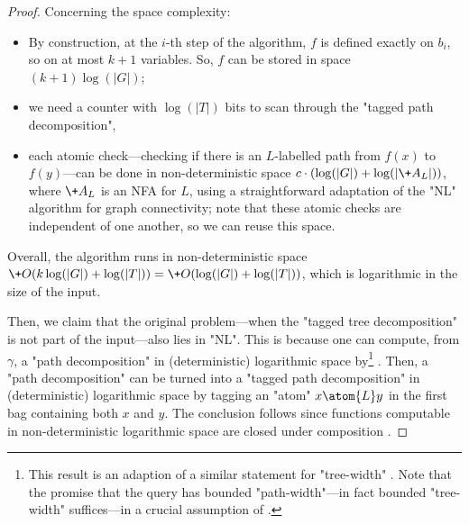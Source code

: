 \begin{proof}
	Concerning the space complexity:
	\begin{itemize}
		\item By construction, at the $i$-th step of the algorithm, $f$ is defined exactly on $b_i$, so on at most $k+1$ variables.
		So, $f$ can be stored in space $(k+1)\log(|G|)$;
		\item we need a counter with $\log(|T|)$ bits to scan through the "tagged path decomposition",
		\item each atomic check---checking if there is an $L$-labelled path from $f(x)$ to $f(y)$---can be done in non-deterministic space $c\cdot (\log(|G|) + \log(|\+A_L|))$,
		where $\+A_L$ is an NFA for $L$, using a straightforward adaptation of the "NL" algorithm for graph connectivity; note that these atomic checks are
		independent of one another, so we can reuse this space.
	\end{itemize}
	Overall, the algorithm runs in non-deterministic space
	$\+O(k\log(|G|) + \log(|T|)) = \+O(\log(|G|) + \log(|T|))$,
	which is logarithmic in the size of the input.

	\smallskip

	Then, we claim that the original problem---when the "tagged tree decomposition" is not part of 
	the input---also lies in "NL". This is because one can compute, from $\gamma$, a
	"path decomposition" in (deterministic) logarithmic space by\footnote{This result is an 
	adaption of a similar statement for "tree-width" \cite[Theorem I.1, p. 143]{ElberfeldJakobyTantau2010Logspace}. Note that the promise that the query has bounded "path-width"---in fact bounded "tree-width" suffices---in a crucial assumption of  \cite[Theorem I.1, p. 143]{ElberfeldJakobyTantau2010Logspace}.} 
	\cite[Theorem 1.3, p. 2]{KintaliMunteanu2010Computing}. Then, a "path decomposition" can be turned into a 
	"tagged path decomposition" in (deterministic) logarithmic space by tagging an "atom"
	$x \atom{L} y$ in the first bag containing both $x$ and $y$.
	The conclusion follows since functions computable in non-deterministic logarithmic space
	are closed under composition \cite[Lemma 4.17, p. 88]{AroraBarak2009ComputationalComplexity}. 
\end{proof}

